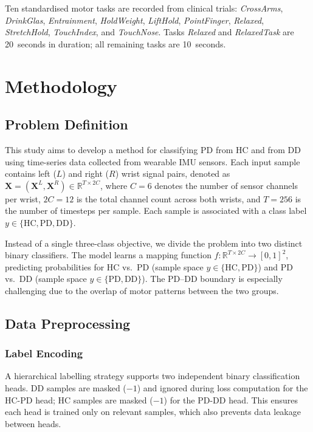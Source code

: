 \documentclass[pmlr]{jmlr}
\begin{document}
Ten standardised motor tasks are recorded from clinical trials:
\textit{CrossArms}, \textit{DrinkGlas}, \textit{Entrainment},
\textit{HoldWeight}, \textit{LiftHold}, \textit{PointFinger},
\textit{Relaxed}, \textit{StretchHold}, \textit{TouchIndex}, and
\textit{TouchNose}. Tasks \textit{Relaxed} and \textit{RelaxedTask}
are 20~seconds in duration; all remaining tasks are 10~seconds.


\section{Methodology}
\label{sec:method}

\subsection{Problem Definition}

This study aims to develop a method for classifying PD from HC and
from DD using time-series data collected from wearable IMU sensors.
Each input sample contains left ($L$) and right ($R$) wrist signal
pairs, denoted as $\mathbf{X} = (\mathbf{X}^L, \mathbf{X}^R) \in
\mathbb{R}^{T \times 2C}$, where $C{=}6$ denotes the number of sensor
channels per wrist, $2C{=}12$ is the total channel count across both
wrists, and $T{=}256$ is the number of timesteps per sample. Each
sample is associated with a class label $y \in \{\text{HC}, \text{PD},
\text{DD}\}$.

Instead of a single three-class objective, we divide the problem into
two distinct binary classifiers. The model learns a mapping function
$f : \mathbb{R}^{T \times 2C} \rightarrow [0,1]^2$, predicting
probabilities for HC vs.~PD (sample space $y \in \{\text{HC},
\text{PD}\}$) and PD vs.~DD (sample space $y \in \{\text{PD},
\text{DD}\}$). The PD--DD boundary is especially challenging due to
the overlap of motor patterns between the two groups.

\subsection{Data Preprocessing}

\subsubsection{Label Encoding}

A hierarchical labelling strategy supports two independent binary
classification heads. DD samples are masked ($-1$) and ignored during
loss computation for the HC-PD head; HC samples are masked ($-1$) for
the PD-DD head. This ensures each head is trained only on relevant
samples, which also prevents data leakage between heads.
\end{document}
